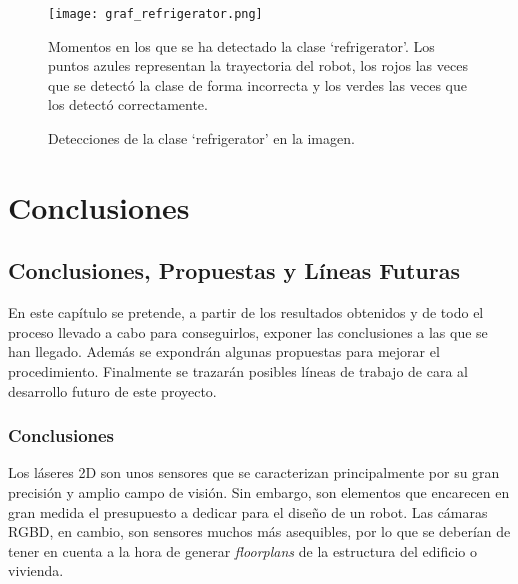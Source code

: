 \begin{figure}[h]
	\begin{center} 
		\texttt{[image: graf\_refrigerator.png]}
	\end{center}
	\caption{Momentos en los que se ha detectado la clase `refrigerator'. Los puntos azules representan la trayectoria del robot, los rojos las veces que se detectó la clase de forma incorrecta y los verdes las veces que los detectó correctamente.}
	\label{fig:graf_refrigerator}
\end{figure}

\begin{figure}[H]
 \centering
  \hspace{0.5cm}
 \caption{Detecciones de la clase `refrigerator' en la imagen.}
 \label{fig:det_refrigerator}
\end{figure}

\part{Conclusiones}

\chapter{Conclusiones, Propuestas y Líneas Futuras}

En este capítulo se pretende, a partir de los resultados obtenidos y de todo el proceso llevado a cabo para conseguirlos, exponer las conclusiones a las que se han llegado. Además se expondrán algunas propuestas para mejorar el procedimiento. Finalmente se trazarán posibles líneas de trabajo de cara al desarrollo futuro de este proyecto.\\

\section{Conclusiones}

Los láseres 2D son unos sensores que se caracterizan principalmente por su gran precisión y amplio campo de visión. Sin embargo, son elementos que encarecen en gran medida el presupuesto a dedicar para el diseño de un robot. Las cámaras RGBD, en cambio, son sensores muchos más asequibles, por lo que se deberían de tener en cuenta a la hora de generar \textit{floorplans} de la estructura del edificio o vivienda.\\

